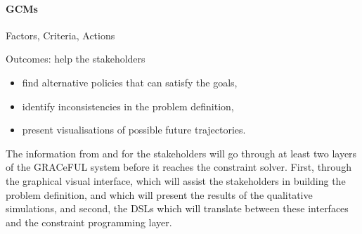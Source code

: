 \paragraph{\acfp{GCM}}

Factors, Criteria, Actions

Outcomes: help the stakeholders

\begin{itemize}
\item find alternative policies that can satisfy the goals,
\item identify inconsistencies in the problem definition,
\item  present visualisations of possible future trajectories.
\end{itemize}

The information from and for the stakeholders will go through at least
two layers of the GRACeFUL system before it reaches the constraint
solver. First, through the graphical visual interface, which will
assist the stakeholders in building the problem definition, and which
will present the results of the qualitative simulations, and second,
the DSLs which will translate between these interfaces and the
constraint programming layer.





